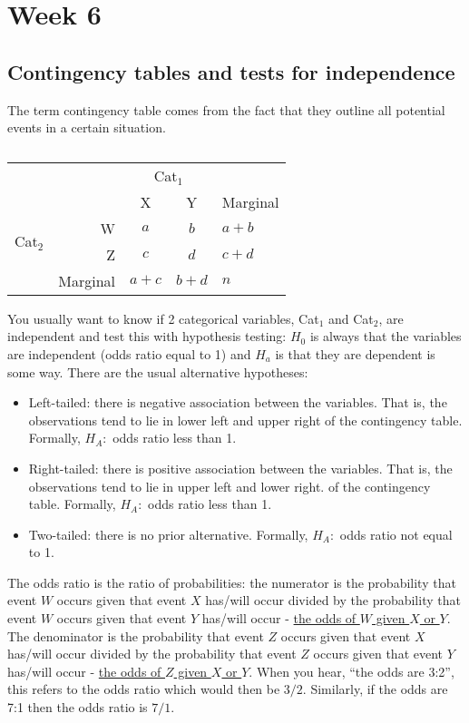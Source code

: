 \section*{Week 6}

\subsection*{Contingency tables and tests for independence}
The term contingency table comes from the fact that they outline all potential events in a certain situation. 
\begin{table}[h]
    \centering
    \begin{tabular}{rr|cc|l}
        {} & {} & \multicolumn{2}{c|}{Cat${}_1$} & {} \\
        {} & {} & X & Y & Marginal \\ \hline
        \multicolumn{1}{r}{\multirow{2}{*}{Cat${}_2$}} & W & $a$ & $b$ & $a + b$ \\
        \multicolumn{1}{r}{} & Z & $c$ & $d$ & $c + d$ \\ \hline
        {} & Marginal & $a + c$ & $b + d$ & $n$
    \end{tabular}
    \caption{}
    \label{tab:1wk6}
\end{table}
You usually want to know if 2 categorical variables, Cat${}_1$ and Cat${}_2$, are independent and test this with hypothesis testing: $H_0$ is always that the variables are independent (odds ratio equal to 1) and $H_a$ is that they are dependent is some way. There are the usual alternative hypotheses:
\begin{itemize}
    \item Left-tailed: there is negative association between the variables. That is, the observations tend to lie in lower left and upper right of the contingency table. Formally, $H_A: $ odds ratio less than 1.
    
    \item Right-tailed: there is positive association between the variables. That is, the observations tend to lie in upper left and lower right. of the contingency table. Formally, $H_A: $ odds ratio less than 1.
    
    \item Two-tailed: there is no prior alternative. Formally, $H_A: $ odds ratio not equal to 1.
\end{itemize}
The odds ratio is the ratio of probabilities: the numerator is the probability that event $W$ occurs given that event $X$ has/will occur divided by the probability that event $W$ occurs given that event $Y$ has/will occur - \underline{the odds of $W$ given $X$ or $Y$}. The denominator is the probability that event $Z$ occurs given that event $X$ has/will occur divided by the probability that event $Z$ occurs given that event $Y$ has/will occur - \underline{the odds of $Z$ given $X$ or $Y$}. When you hear, ``the odds are 3:2'', this refers to the odds ratio which would then be $3/2$. Similarly, if the odds are 7:1 then the odds ratio is $7/1$.
